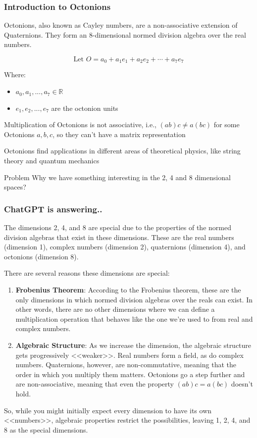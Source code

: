 \documentclass[fullscreen=true, bookmarks=true, hyperref={pdfencoding=unicode}]{beamer}
\begin{document}
\begin{frame}
  \frametitle{Introduction to Octonions}

  Octonions, also known as Cayley numbers, are a non-associative extension of Quaternions. They form an 8-dimensional normed division algebra over the real numbers.

  \pause
  \[
  \text{Let } O = a_0 + a_1e_1 + a_2e_2 + \cdots + a_7e_7
  \]

  Where:
  \begin{itemize}
    \item $a_0, a_1, ..., a_7 \in \mathbb{R}$
    \item $e_1, e_2, ..., e_7$ are the octonion units
  \end{itemize}

  \pause
  Multiplication of Octonions is not associative, i.e., $(ab)c \neq a(bc)$ for some Octonions $a, b, c$, 
  so they can't have a matrix representation

  \pause
  Octonions find applications in different areas of theoretical physics, like string theory and quantum mechanics

  \pause
  \begin{block}{Problem}
    Why we have something interesting in the 2, 4 and 8 dimensional spaces?  
  \end{block}
\end{frame}


\begin{frame}
  \frametitle{ChatGPT is answering..}
  \footnotesize
  The dimensions 2, 4, and 8 are special due to the properties 
  of the normed division algebras that exist in these dimensions. 
  These are the real numbers (dimension 1), complex numbers (dimension 2), 
  quaternions (dimension 4), and octonions (dimension 8).

\pause There are several reasons these dimensions are special:
\begin{enumerate}
  \pause\item \textbf{Frobenius Theorem}: According to the Frobenius theorem, 
  these are the only dimensions in which normed division algebras 
  over the reals can exist. In other words, there are no other 
  dimensions where we can define a multiplication operation 
  that behaves like the one we're used to from real and complex numbers.
  \pause\item \textbf{Algebraic Structure}: As we increase the dimension, 
  the algebraic structure gets progressively <<weaker>>. 
  Real numbers form a field, as do complex numbers. 
  Quaternions, however, are non-commutative, meaning that the order 
  in which you multiply them matters. 
  Octonions go a step further and are non-associative, 
  meaning that even the property $(ab)c = a(bc)$ doesn't hold.
\end{enumerate}

So, while you might initially expect every dimension to have 
its own <<numbers>>, algebraic properties restrict the possibilities, 
leaving 1, 2, 4, and 8 as the special dimensions.  
\end{frame}
\end{document}
